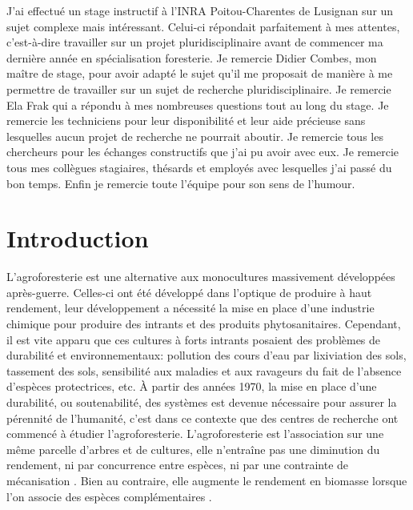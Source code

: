 ﻿\documentclass[12pt]{report}
\begin{document}
J'ai effectué un stage instructif à l'INRA Poitou-Charentes de Lusignan sur un
sujet complexe mais intéressant. Celui-ci répondait parfaitement à mes attentes,
c'est-à-dire travailler sur un projet pluridisciplinaire avant de commencer ma
dernière année en spécialisation foresterie. Je remercie Didier Combes, mon
maître de stage, pour avoir adapté le sujet qu'il me proposait de manière à me
permettre de travailler sur un sujet de recherche pluridisciplinaire. Je
remercie Ela Frak qui a répondu à mes nombreuses questions tout au long du stage.
Je remercie les techniciens pour leur disponibilité et leur aide précieuse sans
lesquelles aucun projet de recherche ne pourrait aboutir. Je remercie tous les chercheurs pour
les échanges constructifs que j'ai pu avoir avec eux. Je remercie tous mes
collègues stagiaires, thésards et employés avec lesquelles j'ai passé du bon
temps. Enfin je remercie toute l'équipe pour son sens de l'humour.

\chapter{Introduction}

L'agroforesterie est une alternative aux monocultures massivement développées
après-guerre. Celles-ci ont été développé dans l'optique de produire à
haut rendement, leur développement a nécessité la mise en place d'une
industrie chimique pour produire des intrants et des produits phytosanitaires.
Cependant, il est vite apparu que ces cultures à forts intrants posaient des
problèmes de durabilité et environnementaux: pollution des cours d'eau par
lixiviation des sols, tassement des sols, sensibilité aux maladies et aux
ravageurs du fait de l'absence d'espèces protectrices, etc. À partir des années
1970, la mise en place d'une durabilité, ou soutenabilité, des systèmes est devenue
nécessaire pour assurer la pérennité de l'humanité, c'est dans ce contexte que des
centres de recherche ont commencé à étudier l'agroforesterie.
L'agroforesterie est l'association sur une même parcelle d'arbres et de cultures,
elle n'entraîne pas une diminution du rendement, ni par concurrence entre espèces,
ni par une contrainte de mécanisation \citep{AF_ref50}. Bien au contraire, elle
augmente le rendement en biomasse lorsque l'on associe des espèces
complémentaires \citep{AF_ref51}.
\end{document}
